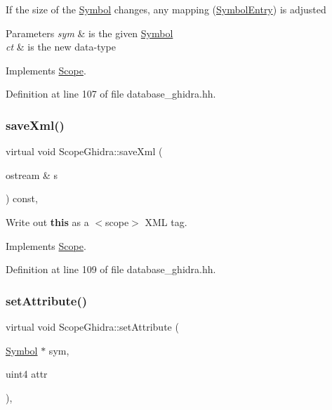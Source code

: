 If the size of the \mbox{\hyperlink{class_symbol}{Symbol}} changes, any mapping (\mbox{\hyperlink{class_symbol_entry}{Symbol\+Entry}}) is adjusted 
\begin{DoxyParams}{Parameters}
{\em sym} & is the given \mbox{\hyperlink{class_symbol}{Symbol}} \\
\hline
{\em ct} & is the new data-\/type \\
\hline
\end{DoxyParams}


Implements \mbox{\hyperlink{class_scope_afeef6a133b07fa176c08b67c44064e69}{Scope}}.



Definition at line 107 of file database\+\_\+ghidra.\+hh.

\mbox{\label{class_scope_ghidra_abb73fa9a07b114dfa8994423f2aae170}} 
\subsubsection{\texorpdfstring{saveXml()}{saveXml()}}
{\footnotesize\ttfamily virtual void Scope\+Ghidra\+::save\+Xml (\begin{DoxyParamCaption}\item[{ostream \&}]{s }\end{DoxyParamCaption}) const\hspace{0.3cm}{\ttfamily [inline]}, {\ttfamily [virtual]}}



Write out {\bfseries{this}} as a $<$scope$>$ X\+ML tag. 



Implements \mbox{\hyperlink{class_scope_a2583da1be37d68197dfbb0445fa1f3e0}{Scope}}.



Definition at line 109 of file database\+\_\+ghidra.\+hh.

\mbox{\label{class_scope_ghidra_a8de7736cd5930af6bdcd29b4673ab037}} 
\subsubsection{\texorpdfstring{setAttribute()}{setAttribute()}}
{\footnotesize\ttfamily virtual void Scope\+Ghidra\+::set\+Attribute (\begin{DoxyParamCaption}\item[{\mbox{\hyperlink{class_symbol}{Symbol}} $\ast$}]{sym,  }\item[{uint4}]{attr }\end{DoxyParamCaption})\hspace{0.3cm}{\ttfamily [inline]}, {\ttfamily [virtual]}}



